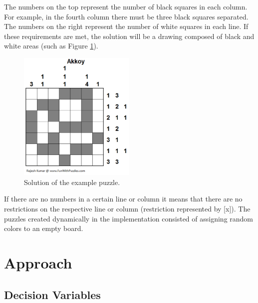 \documentclass[runningheads,a4paper]{llncs}
\begin{document}
The numbers on the top represent the number of black squares in each column. For example, in the fourth column there must be three black squares separated. The numbers on the right represent the number of white squares in each line. If these requirements are met, the solution will be a drawing composed of black and white areas (such as Figure \ref{solution}). 

\begin{figure}[h!]
\centering
\includegraphics[height=6.2cm]{solucaoExemplo.png}
\caption{Solution of the example puzzle.}
\label{solution}
\end{figure}

If there are no numbers in a certain line or column it means that there are no restrictions on the respective line or column (restriction represented by [x]).
The puzzles created dynamically in the implementation consisted of assigning random colors to an empty board.

\section {Approach}

\subsection{Decision Variables}
\end{document}
